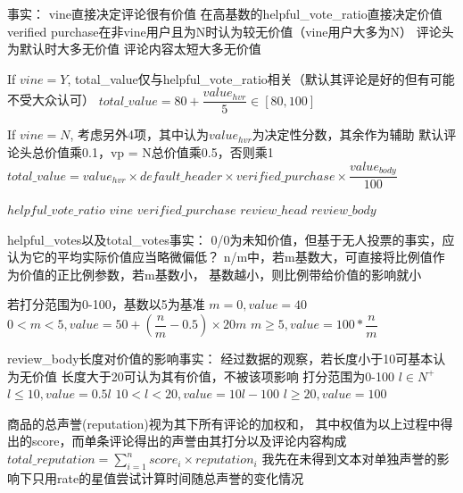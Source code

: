 


事实：
vine直接决定评论很有价值
在高基数的helpful_vote_ratio直接决定价值
verified purchase在非vine用户且为N时认为较无价值（vine用户大多为N）
评论头为默认时大多无价值
评论内容太短大多无价值

If $vine = Y$, total_value仅与helpful_vote_ratio相关（默认其评论是好的但有可能不受大众认可）
$total\_value = 80 + \dfrac{value_{hvr}}{5} \in [80, 100]$

If $vine = N$, 考虑另外4项，其中认为$value_{hvr}$为决定性分数，其余作为辅助
默认评论头总价值乘0.1，vp = N总价值乘0.5，否则乘1
$total\_value = value_{hvr} \times default\_header \times verified\_purchase \times \dfrac{value_{body}}{100} $


$helpful\_vote\_ratio$
$vine$
$verified\_purchase$
$review\_head$
$review\_body$

helpful_votes以及total_votes事实：
0/0为未知价值，但基于无人投票的事实，应认为它的平均实际价值应当略微偏低？
n/m中，若m基数大，可直接将比例值作为价值的正比例参数，若m基数小，
基数越小，则比例带给价值的影响就小

若打分范围为0-100，基数以5为基准
$m = 0, value = 40$
$0 < m < 5, value = 50 + (\dfrac{n}{m} - 0.5) \times 20m$
$m \geq 5, value = 100 * \dfrac{n}{m}$


review_body长度对价值的影响事实：
经过数据的观察，若长度小于10可基本认为无价值
长度大于20可认为其有价值，不被该项影响
打分范围为0-100
$l \in N^+$
$l \leq 10, value = 0.5l$
$10 < l < 20, value = 10l - 100$
$l \geq 20, value = 100$



商品的总声誉(reputation)视为其下所有评论的加权和，
其中权值为以上过程中得出的score，而单条评论得出的声誉由其打分以及评论内容构成
$total\_reputation = \sum^n_{i=1}score_i \times reputation_i$
我先在未得到文本对单独声誉的影响下只用rate的星值尝试计算时间随总声誉的变化情况
